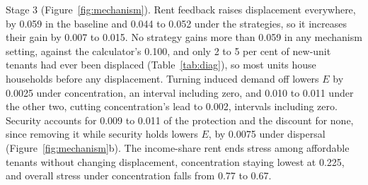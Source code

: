 \documentclass[10pt,a4paper]{article}
\begin{document}
Stage 3 (Figure~\ref{fig:mechanism}). Rent feedback raises displacement everywhere, by 0.059 in the baseline and 0.044 to 0.052 under the strategies, so it increases their gain by 0.007 to 0.015. No strategy gains more than 0.059 in any mechanism setting, against the calculator's 0.100, and only 2 to 5 per cent of new-unit tenants had ever been displaced (Table~\ref{tab:diag}), so most units house households before any displacement. Turning induced demand off lowers $E$ by 0.0025 under concentration, an interval including zero, and 0.010 to 0.011 under the other two, cutting concentration's lead to 0.002, intervals including zero. Security accounts for 0.009 to 0.011 of the protection and the discount for none, since removing it while security holds lowers $E$, by 0.0075 under dispersal (Figure~\ref{fig:mechanism}b). The income-share rent ends stress among affordable tenants without changing displacement, concentration staying lowest at 0.225, and overall stress under concentration falls from 0.77 to 0.67.

\begin{table}[tp]
\centering
\caption{Local sensitivity $\bar S$ of the key metric to each parameter under each condition, the mean relative change in $E$ per unit relative change in the parameter, 30 seeds. Continuous parameters move $\pm15$ per cent. The number of neighbourhoods sampled $k$ moves 3, 4, 5 and the search period $s$ moves 1, 2, 3 quarters, each divided by its own relative shift. Rows give the model's variable name, then the report's symbol. Households are shifted with stock so that occupancy is held fixed. Values of 0.20 or more are in bold, and supply, its cost, and the affordable rent ratio do not apply to the baseline. $b_{\mathrm{high}}$ and $c_{\mathrm{high}}$ are $b_j$ and $c_j$ of the high tier.}
\label{tab:sens}
\small
{}
\end{table}
\end{document}
